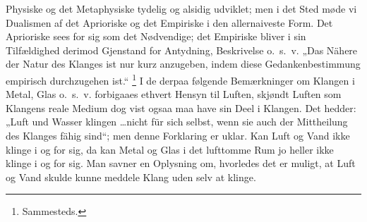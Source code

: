 \documentclass[12pt]{book}
\newcommand{\opage}[1]{\marginnote{\footnotesize\textit{[#1]}}}
\begin{document}
Physiske og det Metaphysiske tydelig og alsidig udviklet; men i det Sted møde vi Dualismen af
det Aprioriske og det Empiriske i den allernaiveste Form. Det Aprioriske sees for sig som det
Nødvendige; det Empiriske bliver i sin Tilfældighed derimod Gjenstand for Antydning,
Beskrivelse o.\ s.\ v. „Das Nähere der Natur des Klanges ist nur kurz anzugeben, indem diese
Gedankenbestimmung empirisch durchzugehen ist.“%
\footnote{Sammesteds.}
I de derpaa følgende Bemærkninger om Klangen i Metal, Glas o.\ s.\ v. forbigaaes ethvert
Hensyn til Luften, skjøndt Luften
\opage{373} som Klangens reale Medium dog vist ogsaa maa have sin Deel i Klangen. Det hedder: „Luft und
Wasser klingen \ldots nicht für sich selbst, wenn sie auch der Mittheilung des Klanges fähig
sind“; men denne Forklaring er uklar. Kan Luft og Vand ikke klinge i og for sig, da kan Metal
og Glas i det lufttomme Rum jo heller ikke klinge i og for sig. Man savner en Oplysning om,
hvorledes det er muligt, at Luft og Vand skulde kunne meddele Klang uden selv at klinge.
\end{document}

